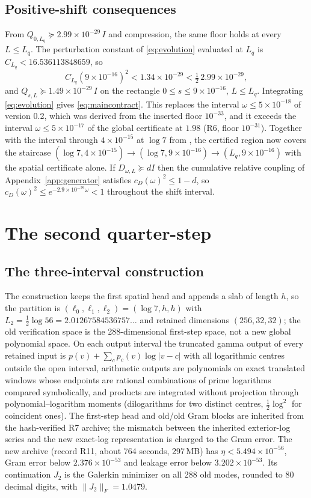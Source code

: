 \documentclass[11pt]{article}
\numberwithin{equation}{section}
\theoremstyle{definition}
\theoremstyle{remark}
\newcommand{\norm}[1]{\lVert#1\rVert}
\newcommand{\Lq}{L_q}
\newcommand{\Ltwo}{L_2}
\newcommand{\FloorAbs}{2.99\times10^{-29}}          %
\newcommand{\FloorAbsHalf}{1.49\times10^{-29}}      %
\newcommand{\ShiftBound}{9\times10^{-16}}           %
\newcommand{\DefectRate}{2.9\times10^{-29}}         %
\begin{document}
\subsection{Positive-shift consequences}
From $Q_{0,\Lq}\succeq\FloorAbs\,I$ and compression, the same floor holds at every $L\le\Lq$. The perturbation constant of \eqref{eq:evolution} evaluated at $\Lq$ is $C_{\Lq}<16.536113848659$, so
\[
 C_{\Lq}(\ShiftBound)^2<1.34\times10^{-29}<\tfrac12\,\FloorAbs ,
\]
and $Q_{s,L}\succeq\FloorAbsHalf\,I$ on the rectangle $0\le s\le\ShiftBound$, $L\le\Lq$. Integrating \eqref{eq:evolution} gives \eqref{eq:maincontract}. This replaces the interval $\omega\le5\times10^{-18}$ of version 0.2, which was derived from the inserted floor $10^{-33}$, and it exceeds the interval $\omega\le5\times10^{-17}$ of the global certificate at $1.98$ (R6, floor $10^{-31}$). Together with the interval through $4\times10^{-15}$ at $\log7$ from \cite{WeilDepth}, the certified region now covers the staircase $(\log7,4\times10^{-15})\to(\log7,\ShiftBound)\to(\Lq,\ShiftBound)$ with the spatial certificate alone. If $D_{\omega,L}\succeq dI$ then the cumulative relative coupling of Appendix~\ref{app:generator} satisfies $c_D(\omega)^2\le1-d$, so $c_D(\omega)^2\le e^{-\DefectRate\omega}<1$ throughout the shift interval.

\section{The second quarter-step}\label{sec:second}

\subsection{The three-interval construction}
The construction keeps the first spatial head and appends a slab of length $h$, so the partition is $(\ell_0,\ell_1,\ell_2)=(\log7,h,h)$ with $\Ltwo=\tfrac12\log56=2.01267584536757\ldots$ and retained dimensions $(256,32,32)$; the old verification space is the 288-dimensional first-step space, not a new global polynomial space. On each output interval the truncated gamma output of every retained input is $p(v)+\sum_cp_c(v)\log|v-c|$ with all logarithmic centres outside the open interval, arithmetic outputs are polynomials on exact translated windows whose endpoints are rational combinations of prime logarithms compared symbolically, and products are integrated without projection through polynomial--logarithm moments (dilogarithms for two distinct centres, $\tfrac12\log^2$ for coincident ones). The first-step head and old/old Gram blocks are inherited from the hash-verified R7 archive; the mismatch between the inherited exterior-log series and the new exact-log representation is charged to the Gram error. The new archive (record R11, about 764 seconds, 297\,MB) has $\eta<5.494\times10^{-56}$, Gram error below $2.376\times10^{-53}$ and leakage error below $3.202\times10^{-53}$. Its continuation $J_2$ is the Galerkin minimizer on all 288 old modes, rounded to 80 decimal digits, with $\norm{J_2}_F=1.0479$.
\end{document}
